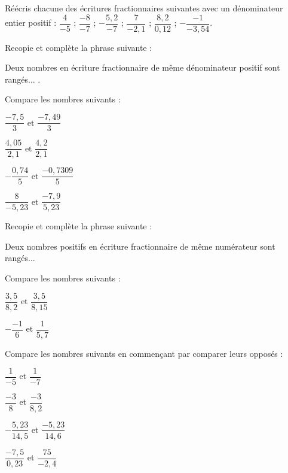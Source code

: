 \begin{exercice}

Réécris chacune des écritures fractionnaires suivantes avec un dénominateur entier positif :
$\dfrac{4}{-5}$ ; $\dfrac{-8}{-7}$ ; $-\dfrac{5,2}{-7}$ ; $\dfrac{7}{-2,1}$ ; $\dfrac{8,2}{0,12}$ ; $-\dfrac{-1}{-3,54}$.
\end{exercice}



\begin{exercice}

\begin{colenumerate}{1} 
\item Recopie et complète la phrase suivante :

\og Deux nombres en écriture fractionnaire de même dénominateur positif sont rangés... \fg.
\item Compare les nombres suivants :

$\dfrac{-7,5}{3} \text{ et } \dfrac{-7,49}{3}$

$\dfrac{4,05}{2,1} \text{ et } \dfrac{4,2}{2,1}$

$-\dfrac{0,74}{5} \text{ et } \dfrac{-0,7309}{5}$

$\dfrac{8}{-5,23} \text{ et } \dfrac{-7,9}{5,23}$
\end{colenumerate} 
\end{exercice}

\begin{exercice}

\begin{colenumerate}{1} 
\item Recopie et complète la phrase suivante :

\og Deux nombres positifs en écriture fractionnaire de même numérateur sont rangés... \fg
\item Compare les nombres suivants :

$\dfrac{3,5}{8,2} \text{ et } \dfrac{3,5}{8,15}$

$-\dfrac{-1}{6} \text{ et } \dfrac{1}{5,7}$
\end{colenumerate} 
\end{exercice}

\begin{exercice}

Compare les nombres suivants en commençant par comparer leurs opposés :

\begin{colenumerate}{2} 
\item $\dfrac{1}{-5}$ et $\dfrac{1}{-7}$
\item $\dfrac{-3}{8}$ et $\dfrac{-3}{8,2}$
\item $-\dfrac{5,23}{14,5}$ et $\dfrac{-5,23}{14,6}$
\item $\dfrac{-7,5}{0,23}$ et $\dfrac{75}{-2,4}$
\end{colenumerate} 
\end{exercice}




